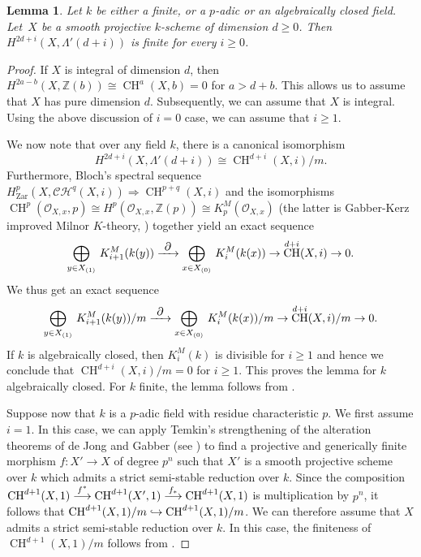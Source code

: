\documentclass[11pt]{article}
\numberwithin{equation}{section}
\let\mathcal\mathscr
\def\hto{\mathrel{\lhook\joinrel\to}}
\def\To#1{\mathchoice{\xrightarrow{\textstyle\kern4pt#1\kern3pt}}{\stackrel{#1}{\longrightarrow}}{}{}}
\let\inj\hto
\newtheorem{lem}[thm]{Lemma}
\theoremstyle{definition}
\newcommand{\sC}{{\mathcal C}}
\newcommand{\sH}{{\mathcal H}}
\newcommand{\sO}{{\mathcal O}}\let\cO\sO
\newcommand{\Z}{{\mathbb Z}}
\DeclareMathOperator{\CH}{CH}
\newcommand{\zar}{\mathrm{Zar}}
\begin{document}
\begin{lem}\label{lem:smooth-proj-fin}
Let $k$ be either a finite, or a $p$-adic or an algebraically closed field.
Let~$X$ be a smooth projective $k$-scheme of dimension $d \ge 0$.
Then $H^{2d+i}(X, \Lambda'(d+i))$ is finite for every $i \ge 0$.
\end{lem}
\begin{proof}
If $X$ is integral of dimension $d$, then $H^{2a-b}(X, \Z(b)) \cong
\CH^a(X, b) = 0$ for $a > d+b$. This allows us to assume that
$X$ has pure dimension $d$. Subsequently, we can assume that $X$ is integral.
Using the above discussion of $i = 0$ case, we can assume that $i \ge 1$.

We now note that over any field $k$, there is a canonical isomorphism
\[
H^{2d+i}(X, \Lambda'(d+i)) \cong {\CH^{d+i}(X, i)}/m.
\]
Furthermore, Bloch's spectral sequence $H^p_\zar(X, {\sC}{\sH}^q(X,i))
\Rightarrow \CH^{p+q}(X,i)$ and
the isomorphisms $\CH^p(\sO_{X,x}, p) \cong
H^p(\sO_{X,x}, \Z(p)) \cong K^M_p(\sO_{X,x})$
(the latter is Gabber-Kerz improved Milnor $K$-theory, \cite{Kerz10})
together yield an exact sequence
\begin{equation}\label{eqn:smooth-proj-fin-0}
{\underset{y \in X_{(1)}}\bigoplus} \ K^M_{i+1}(k(y))
\To{\partial} {\underset{x \in X_{(0)}}\bigoplus} \ K^M_{i}(k(x))
\to \CH^{d+i}(X, i) \to 0.
\end{equation}
We thus get an exact sequence
\begin{equation}\label{eqn:smooth-proj-fin-2}
{\underset{y \in X_{(1)}}\bigoplus} \ {K^M_{i+1}(k(y))}/m
\To{\partial} {\underset{x \in X_{(0)}}\bigoplus} \ {K^M_{i}(k(x))}/m
\to {\CH^{d+i}(X, i)}/m \to 0.
\end{equation}
If $k$ is algebraically closed, then $K^M_{i}(k)$ is divisible for $i \ge 1$
and hence we conclude that ${\CH^{d+i}(X, i)}/m = 0$ for $i \ge 1$.
This proves the lemma for $k$ algebraically closed.
For $k$ finite, the lemma follows from \cite[Th.\,1.2, 1.3]{Akthar}.

Suppose now that $k$ is a $p$-adic field with residue characteristic $p$.
We first assume $i =1$. In this case, we can apply Temkin's
strengthening of the alteration theorems of de Jong and Gabber
(see \cite[Th.\,1.2.5]{Temkin}) to find a projective and generically
finite morphism $f \colon X' \to X$ of degree $p^n$ such that
$X'$ is a smooth projective scheme over $k$ which admits a strict semi-stable
reduction over $k$. Since the composition $\CH^{d+1}(X, 1)
\To{f^*} \CH^{d+1}(X', 1) \To{f_*} \CH^{d+1}(X, 1)$
is multiplication by $p^n$, it follows that
${\CH^{d+1}(X, 1)}/m \inj {\CH^{d+1}(X, 1)}/m$. We can therefore assume that
$X$ admits a strict semi-stable reduction over $k$. In this case, the
finiteness of ${\CH^{d+1}(X, 1)}/m$ follows from
\cite[Th.\,3.1.4]{Forre}.


\end{proof}
\end{document}
